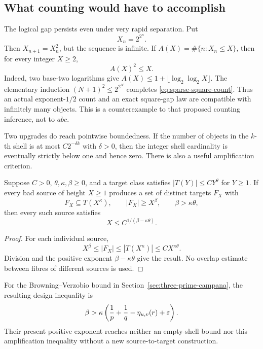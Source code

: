 \subsection{What counting would have to accomplish}

The logical gap persists even under very rapid separation.  Put
\[
                         X_n=2^{2^n}.
\]
Then $X_{n+1}=X_n^2$, but the sequence is infinite.  If
$A(X)=\#\{n:X_n\leq X\}$, then for every integer $X\geq2$,
\begin{equation}\label{eq:sparse-square-count}
                              A(X)^2\leq X.
\end{equation}
Indeed, two base-two logarithms give
$A(X)\leq 1+\lfloor\log_2\log_2X\rfloor$.  The elementary induction
$(N+1)^2\leq2^{2^N}$ completes \eqref{eq:sparse-square-count}.  Thus an
actual exponent-$1/2$ count and an exact square-gap law are compatible with
infinitely many objects.  This is a counterexample to that proposed counting
inference, not to $abc$.

Two upgrades do reach pointwise boundedness.  If the number of objects in
the $k$-th shell is at most $C2^{-\delta k}$ with $\delta>0$, then the
integer shell cardinality is eventually strictly below one and hence zero.
There is also a useful amplification criterion.

\begin{proposition}
\label{prop:single-source-amplification}
Suppose $C>0$, $\theta,\kappa,\beta\geq0$, and a target class satisfies
$|T(Y)|\leq CY^\theta$ for $Y\geq1$.  If every bad source of height
$X\geq1$ produces a set of distinct targets $F_X$ with
\[
 F_X\subseteq T(X^\kappa),\qquad |F_X|\geq X^\beta,
 \qquad \beta>\kappa\theta,
\]
then every such source satisfies
\[
                  X\leq C^{1/(\beta-\kappa\theta)}.
\]
\end{proposition}

\begin{proof}
For each individual source,
\[
 X^\beta\leq|F_X|\leq|T(X^\kappa)|
       \leq CX^{\kappa\theta}.
\]
Division and the positive exponent $\beta-\kappa\theta$ give the result.
No overlap estimate between fibres of different sources is used.
\end{proof}

For the Browning--Verzobio bound in
Section~\ref{sec:three-prime-campana}, the resulting design inequality is
\[
 \beta>\kappa\left(\frac1p+\frac1q-\eta_{u,v}(r)+\varepsilon\right).
\]
Their present positive exponent reaches neither an empty-shell bound nor
this amplification inequality without a new source-to-target construction.

